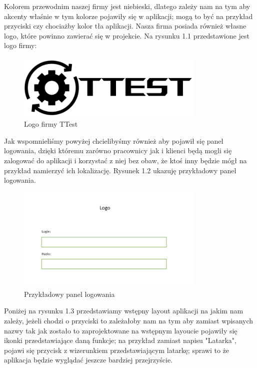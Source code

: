 Kolorem przewodnim naszej firmy jest niebieski, dlatego zależy nam na tym aby akcenty właśnie w tym kolorze pojawiły się w aplikacji; mogą to być na przykład przyciski czy chociażby kolor tła aplikacji. Nasza firma posiada również własne logo, które powinno zawierać się w projekcie.\newline
Na rysunku 1.1 przedstawione jest logo firmy: \newline
\begin{figure}[!hbt]
	\begin{center}
		\includegraphics[angle=360, width=0.80\textwidth]{rys/logo_black.png}
		\caption{Logo firmy TTest}
		\label{rys:logo}
	\end{center}
\end{figure}
\newline

 Jak wspomnieliśmy powyżej chcielibyśmy również aby pojawił się panel logowania, dzięki któremu zarówno pracownicy jak i klienci będą mogli się zalogować do aplikacji i korzystać z niej bez obaw, że ktoś inny będzie mógł na przykład namierzyć ich lokalizację. Rysunek 1.2 ukazuję przykładowy panel logowania. \newline

\begin{figure}[!hbt]
	\begin{center}
		\includegraphics[angle=360, width=0.80\textwidth]{rys/Layout_2.jpg}
		\caption{Przykładowy panel logowania }
		\label{rys:Login}
	\end{center}
\end{figure}
\newpage
 Poniżej na rysunku 1.3 przedstawiamy wstępny layout aplikacji na jakim nam zależy, jeżeli chodzi o przyciski to zależałoby nam na tym aby zamiast wpisanych nazwy tak jak zostało to zaprojektowane na wstępnym layoucie pojawiły się ikonki przedstawiające daną funkcje; na przykład zamiast napisu "Latarka", pojawi się przycisk z wizerunkiem przedstawiającym latarkę; sprawi to że aplikacja będzie wyglądać jeszcze bardziej przejrzyście. \newline
 
